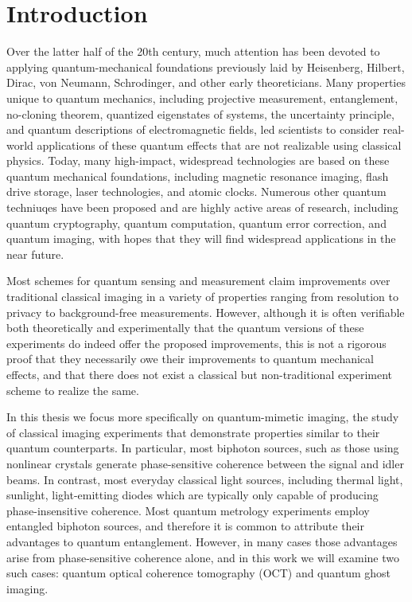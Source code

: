 \chapter{Introduction}
Over the latter half of the 20th century, much attention has been devoted to applying quantum-mechanical foundations previously laid by Heisenberg, Hilbert, Dirac, von Neumann, Schrodinger, and other early theoreticians. Many properties unique to quantum mechanics, including projective measurement, entanglement, no-cloning theorem, quantized eigenstates of systems, the uncertainty principle, and quantum descriptions of electromagnetic fields, led scientists to consider real-world applications of these quantum effects that are not realizable using classical physics. Today, many high-impact, widespread technologies are based on these quantum mechanical foundations, including magnetic resonance imaging, flash drive storage, laser technologies, and atomic clocks. Numerous other quantum techniuqes have been proposed and are highly active areas of research, including quantum cryptography, quantum computation, quantum error correction, and quantum imaging, with hopes that they will find widespread applications in the near future.

Most schemes for quantum sensing and measurement claim improvements over traditional classical imaging in a variety of properties ranging from resolution to privacy to background-free measurements. However, although it is often verifiable both theoretically and experimentally that the quantum versions of these experiments do indeed offer the proposed improvements, this is not a rigorous proof that they necessarily owe their improvements to quantum mechanical effects, and that there does not exist a classical but non-traditional experiment scheme to realize the same.

In this thesis we focus more specifically on quantum-mimetic imaging, the study of classical imaging experiments that demonstrate properties similar to their quantum counterparts. In particular, most biphoton sources, such as those using nonlinear crystals generate phase-sensitive coherence between the signal and idler beams. In contrast, most everyday classical light sources, including thermal light, sunlight, light-emitting diodes which are typically only capable of producing phase-insensitive coherence. Most quantum metrology experiments employ entangled biphoton sources, and therefore it is common to attribute their advantages to quantum entanglement. However, in many cases those advantages arise from phase-sensitive coherence alone, and in this work we will examine two such cases: quantum optical coherence tomography (OCT) and quantum ghost imaging.

